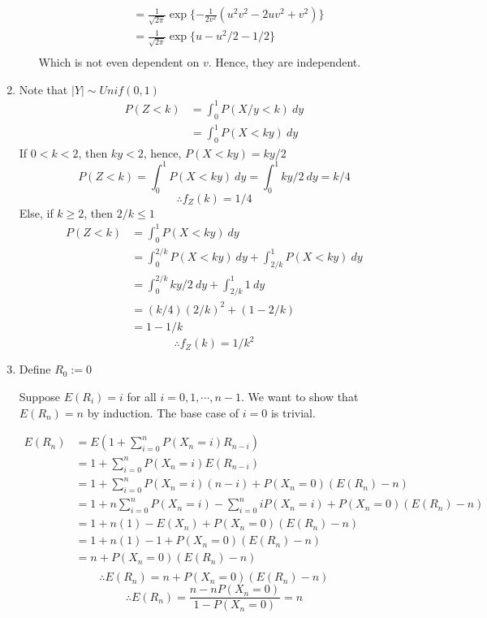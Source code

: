 \documentclass[12pt]{article}
\theoremstyle{definition}
\begin{document}
\begin{enumerate}
\begin{enumerate}[label=(\alph*)]
\begin{align*}
    &= \frac{1}{\sqrt{2\pi}} \exp\{-\frac{1}{2v^2} (u^2v^2-2uv^2+v^2)\} \\
    &= \frac{1}{\sqrt{2\pi}} \exp\{u - u^2/2 - 1/2\} \\
\end{align*}
Which is not even dependent on $v$. Hence, they are independent.
\end{enumerate}
\item
Note that $|Y| \sim Unif(0,1)$
\begin{align*}
P(Z < k) &= \int_0^1 P(X/y < k) \ dy \\
    &= \int_0^1 P(X < ky) \ dy
\end{align*}
If $0 < k < 2$, then $ky < 2$, hence, $P(X < ky) = ky/2$
\[P(Z < k) = \int_0^1 P(X < ky) \ dy = \int_0^1 ky/2 \ dy = k/4\]
\[\therefore f_Z(k) = 1/4\]
Else, if $k \geq 2$, then $2/k \leq 1$
\begin{align*}
P(Z < k) &= \int_0^1 P(X < ky) \ dy \\
    &= \int_0^{2/k} P(X < ky) \ dy + \int_{2/k}^1 P(X < ky) \ dy \\
    &= \int_0^{2/k} ky/2 \ dy + \int_{2/k}^1 1 \ dy \\
    &= (k/4)(2/k)^2 + (1-2/k) \\
    &= 1 - 1/k
\end{align*}
\[\therefore f_Z(k) = 1/k^2\]
\item
Define $R_0 := 0$

Suppose $E(R_i) = i$ for all $i=0,1,\cdots, n-1$. We want to show that $E(R_n) = n$ by induction. The base case of $i=0$ is trivial.

\begin{align*}
E(R_n) &= E(1 + \sum_{i=0}^n P(X_n = i)R_{n-i}) \\
    &= 1 + \sum_{i=0}^n P(X_n = i)E(R_{n-i}) \\
    &= 1 + \sum_{i=0}^n P(X_n = i)(n-i) + P(X_n = 0)(E(R_n) - n) \\
    &= 1 + n \sum_{i=0}^n P(X_n = i) - \sum_{i=0}^n i P(X_n = i) + P(X_n = 0)(E(R_n) - n) \\
    &= 1 + n (1) - E(X_n) + P(X_n = 0)(E(R_n) - n) \\
    &= 1 + n (1) - 1 + P(X_n = 0)(E(R_n) - n) \\
    &= n + P(X_n = 0)(E(R_n) - n) \\
\end{align*}
\[\therefore E(R_n) = n + P(X_n = 0)(E(R_n) - n)\]
\[\therefore E(R_n) = \frac{n - n P(X_n = 0)}{1 - P(X_n = 0)} = n\]
\end{enumerate}
\end{document}
